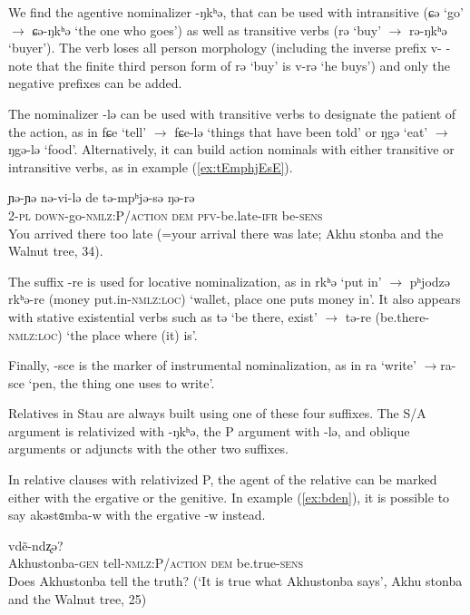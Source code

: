 \documentclass[oneside,a4paper,11pt]{article}
\newcommand{\ipa}[1]{{\phon#1}} %
\begin{document}
We find the agentive nominalizer \ipa{-ŋkʰə}, that can be used with intransitive (\ipa{ɕə}  `go' $\rightarrow$ \ipa{ɕə-ŋkʰə} `the one who goes') as well as transitive verbs (\ipa{rə} `buy' $\rightarrow$ \ipa{rə-ŋkʰə} `buyer'). The verb loses all person morphology (including the inverse prefix \ipa{v-} - note that the finite third person form of \ipa{rə} `buy' is \ipa{v-rə} `he buys') and only the negative prefixes can be added.
 
The nominalizer \ipa{-lə} can be used with transitive verbs to designate the patient of the action, as in \ipa{fɕe} `tell' $\rightarrow$ \ipa{fɕe-lə} `things that have been told' or \ipa{ŋgə} `eat' $\rightarrow$ \ipa{ŋgə-lə} `food'. Alternatively, it can build action nominals with either transitive or intransitive verbs, as  in example (\ref{ex:tEmphjEsE}).

\begin{exe}
\ex \label{ex:tEmphjEsE} 
\gll
\ipa{ɲə-ɲə} 	\ipa{nə-vi-lə} 	\ipa{de} 	\ipa{tə-mpʰjə-sə} 	\ipa{ŋə-rə} \\
2-\textsc{pl} \textsc{down}-go-\textsc{nmlz:P/action} \textsc{dem} \textsc{pfv}-be.late-\textsc{ifr} be-\textsc{sens}\\
\glt You arrived there too late (=your arrival there was late; Akhu stonba and the Walnut tree, 34).
\end{exe}

The suffix \ipa{-re} is used for locative nominalization, as in \ipa{rkʰə} `put in' $\rightarrow$ \ipa{pʰjodzə} \ipa{rkʰə-re} (money put.in-\textsc{nmlz:loc}) `wallet, place one puts money in'. It also appears with stative existential verbs such as \ipa{tə} `be there, exist' $\rightarrow$ \ipa{tə-re} (be.there-\textsc{nmlz:loc}) `the place where (it) is'. 

Finally, \ipa{-sce} is the marker of instrumental nominalization, as in \ipa{ra} `write' $\rightarrow$\ipa{ra-sce} `pen, the thing one uses to write'.

Relatives in Stau are always built using one of these four suffixes. The S/A  argument is relativized with \ipa{-ŋkʰə}, the P argument with \ipa{-lə}, and oblique arguments or adjuncts with the other two suffixes. 

In relative clauses with relativized P, the agent of the relative can be marked either with the ergative or the genitive. In example (\ref{ex:bden}), it is possible to say  \ipa{akəstɞmba-w} with the ergative \ipa{-w} instead.

\begin{exe}
\ex \label{ex:bden}
\gll 
 [\ipa{akəstɞmba-j} 	\ipa{fɕe-lə}] 	\ipa{de} 	\ipa{vdẽ-ndʐə?} \\
 Akhustonba-\textsc{gen} tell-\textsc{nmlz:P/action} \textsc{dem} be.true-\textsc{sens} \\
\glt Does Akhustonba tell the truth?  (`It is true what Akhustonba says', Akhu stonba and the Walnut tree, 25)
\end{exe}
\end{document}
